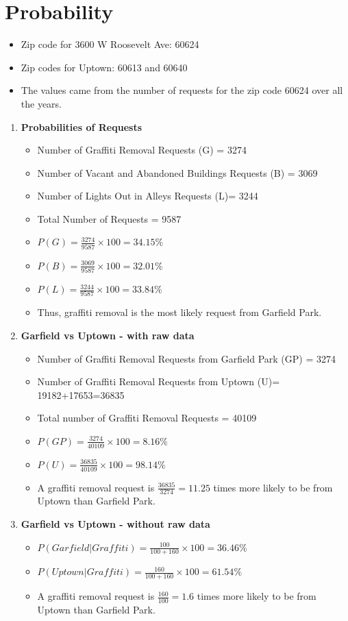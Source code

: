 \documentclass[letterpaper,12pt]{article}
\begin{document}
\section{Probability}
\begin{itemize}
\item Zip code for 3600 W Roosevelt Ave: 60624
\item Zip codes for Uptown: 60613 and 60640
\item The values came from the number of requests for the zip code 60624 over all the years.
\end{itemize}

\begin{enumerate}[label = \Alph*]
\item \textbf{Probabilities of Requests}
\begin{itemize}
\item Number of Graffiti Removal Requests (G) = 3274
\item Number of Vacant and Abandoned Buildings Requests (B) = 3069
\item Number of Lights Out in Alleys Requests (L)= 3244
\item Total Number of Requests = 9587
\item $P(G) = \frac{3274}{9587} \times 100 = 34.15\%$
\item $P(B) = \frac{3069}{9587} \times 100 = 32.01\%$
\item $P(L) = \frac{3244}{9587} \times 100 = 33.84\%$
\item Thus, graffiti removal is the most likely request from Garfield Park.
\end{itemize}

\item \textbf{Garfield vs Uptown - with raw data}
\begin{itemize}
\item Number of Graffiti Removal Requests from Garfield Park (GP) = 3274
\item Number of Graffiti Removal Requests from Uptown (U)= 19182+17653=36835
\item Total number of Graffiti Removal Requests = 40109
\item $P(GP) = \frac{3274}{40109} \times 100 = 8.16 \%$
\item $P(U) = \frac{36835}{40109} \times 100 = 98.14 \%$
\item A graffiti removal request is $\frac{36835}{3274} = 11.25$ times more likely to be from Uptown than Garfield Park.
\end{itemize}

\item \textbf{Garfield vs Uptown - without raw data}
\begin{itemize}
\item $P(Garfield | Graffiti) = \frac{100}{100+160} \times 100 = 36.46 \%$
\item $P(Uptown | Graffiti) = \frac{160}{100+160} \times 100 =61.54 \%$
\item A graffiti removal request is $\frac{160}{100} = 1.6$ times more likely to be from Uptown than Garfield Park.
\end{itemize}

\end{enumerate}
\end{document}
